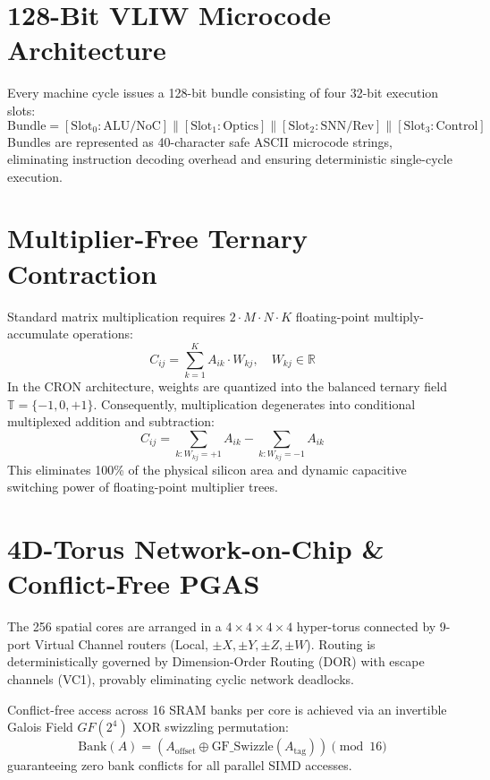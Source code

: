 \documentclass[10pt,journal,compsoc]{IEEEtran}
\begin{document}
\section{128-Bit VLIW Microcode Architecture}
Every machine cycle issues a 128-bit bundle consisting of four 32-bit execution slots:
\begin{equation}
\text{Bundle} = [\text{Slot}_0: \text{ALU/NoC}] \parallel [\text{Slot}_1: \text{Optics}] \parallel [\text{Slot}_2: \text{SNN/Rev}] \parallel [\text{Slot}_3: \text{Control}]
\end{equation}
Bundles are represented as 40-character safe ASCII microcode strings, eliminating instruction decoding overhead and ensuring deterministic single-cycle execution.

\section{Multiplier-Free Ternary Contraction}
Standard matrix multiplication requires $2 \cdot M \cdot N \cdot K$ floating-point multiply-accumulate operations:
\begin{equation}
C_{ij} = \sum_{k=1}^K A_{ik} \cdot W_{kj}, \quad W_{kj} \in \mathbb{R}
\end{equation}
In the CRON architecture, weights are quantized into the balanced ternary field $\mathbb{T} = \{-1, 0, +1\}$. Consequently, multiplication degenerates into conditional multiplexed addition and subtraction:
\begin{equation}
C_{ij} = \sum_{k: W_{kj} = +1} A_{ik} - \sum_{k: W_{kj} = -1} A_{ik}
\end{equation}
This eliminates 100\% of the physical silicon area and dynamic capacitive switching power of floating-point multiplier trees.

\section{4D-Torus Network-on-Chip \& Conflict-Free PGAS}
The 256 spatial cores are arranged in a $4 \times 4 \times 4 \times 4$ hyper-torus connected by 9-port Virtual Channel routers (Local, $\pm X, \pm Y, \pm Z, \pm W$). Routing is deterministically governed by Dimension-Order Routing (DOR) with escape channels (VC1), provably eliminating cyclic network deadlocks.

Conflict-free access across 16 SRAM banks per core is achieved via an invertible Galois Field $GF(2^4)$ XOR swizzling permutation:
\begin{equation}
\text{Bank}(A) = (A_{\text{offset}} \oplus \text{GF\_Swizzle}(A_{\text{tag}})) \pmod{16}
\end{equation}
guaranteeing zero bank conflicts for all parallel SIMD accesses.
\end{document}

